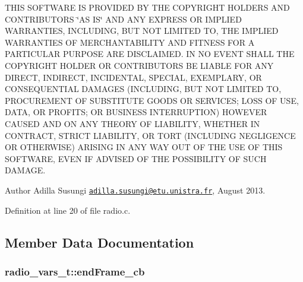 T\+H\+IS S\+O\+F\+T\+W\+A\+RE IS P\+R\+O\+V\+I\+D\+ED BY T\+HE C\+O\+P\+Y\+R\+I\+G\+HT H\+O\+L\+D\+E\+RS A\+ND C\+O\+N\+T\+R\+I\+B\+U\+T\+O\+RS \char`\"{}\+A\+S I\+S\char`\"{} A\+ND A\+NY E\+X\+P\+R\+E\+SS OR I\+M\+P\+L\+I\+ED W\+A\+R\+R\+A\+N\+T\+I\+ES, I\+N\+C\+L\+U\+D\+I\+NG, B\+UT N\+OT L\+I\+M\+I\+T\+ED TO, T\+HE I\+M\+P\+L\+I\+ED W\+A\+R\+R\+A\+N\+T\+I\+ES OF M\+E\+R\+C\+H\+A\+N\+T\+A\+B\+I\+L\+I\+TY A\+ND F\+I\+T\+N\+E\+SS F\+OR A P\+A\+R\+T\+I\+C\+U\+L\+AR P\+U\+R\+P\+O\+SE A\+RE D\+I\+S\+C\+L\+A\+I\+M\+ED. IN NO E\+V\+E\+NT S\+H\+A\+LL T\+HE C\+O\+P\+Y\+R\+I\+G\+HT H\+O\+L\+D\+ER OR C\+O\+N\+T\+R\+I\+B\+U\+T\+O\+RS BE L\+I\+A\+B\+LE F\+OR A\+NY D\+I\+R\+E\+CT, I\+N\+D\+I\+R\+E\+CT, I\+N\+C\+I\+D\+E\+N\+T\+AL, S\+P\+E\+C\+I\+AL, E\+X\+E\+M\+P\+L\+A\+RY, OR C\+O\+N\+S\+E\+Q\+U\+E\+N\+T\+I\+AL D\+A\+M\+A\+G\+ES (I\+N\+C\+L\+U\+D\+I\+NG, B\+UT N\+OT L\+I\+M\+I\+T\+ED TO, P\+R\+O\+C\+U\+R\+E\+M\+E\+NT OF S\+U\+B\+S\+T\+I\+T\+U\+TE G\+O\+O\+DS OR S\+E\+R\+V\+I\+C\+ES; L\+O\+SS OF U\+SE, D\+A\+TA, OR P\+R\+O\+F\+I\+TS; OR B\+U\+S\+I\+N\+E\+SS I\+N\+T\+E\+R\+R\+U\+P\+T\+I\+ON) H\+O\+W\+E\+V\+ER C\+A\+U\+S\+ED A\+ND ON A\+NY T\+H\+E\+O\+RY OF L\+I\+A\+B\+I\+L\+I\+TY, W\+H\+E\+T\+H\+ER IN C\+O\+N\+T\+R\+A\+CT, S\+T\+R\+I\+CT L\+I\+A\+B\+I\+L\+I\+TY, OR T\+O\+RT (I\+N\+C\+L\+U\+D\+I\+NG N\+E\+G\+L\+I\+G\+E\+N\+CE OR O\+T\+H\+E\+R\+W\+I\+SE) A\+R\+I\+S\+I\+NG IN A\+NY W\+AY O\+UT OF T\+HE U\+SE OF T\+H\+IS S\+O\+F\+T\+W\+A\+RE, E\+V\+EN IF A\+D\+V\+I\+S\+ED OF T\+HE P\+O\+S\+S\+I\+B\+I\+L\+I\+TY OF S\+U\+CH D\+A\+M\+A\+GE.

\begin{DoxyAuthor}{Author}
Adilla Susungi \href{mailto:adilla.susungi@etu.unistra.fr}{\tt adilla.\+susungi@etu.\+unistra.\+fr}, August 2013. 
\end{DoxyAuthor}


Definition at line 20 of file radio.\+c.



\subsection{Member Data Documentation}
\subsubsection[{\texorpdfstring{end\+Frame\+\_\+cb}{endFrame_cb}}]{ radio\+\_\+vars\+\_\+t\+::end\+Frame\+\_\+cb}\hypertarget{structradio__vars__t_ab21d0657d3d50dfdb1242dc932ac1837}{}\label{structradio__vars__t_ab21d0657d3d50dfdb1242dc932ac1837}


